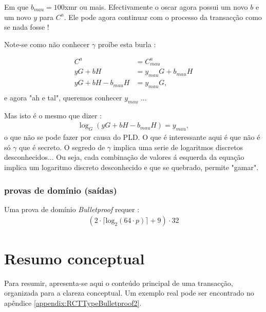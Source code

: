 Em que $b_{mau} = 100$xmr ou mais. Efectivamente o oscar agora possui um novo $b$ e um novo $y$ para $C^a$. Ele pode agora continuar com o processo da transacção como se nada fosse ! 

Note-se como não conhecer $\gamma$ proíbe esta burla :

\begin{align*}
C^a &= C^a_{mau}\\
y G + b H &= y_{mau} G + b_{mau} H \\
y G + b H - b_{mau} H &= y_{mau} G,\\
\end{align*}
e agora "ah e tal", queremos conhecer $y_{mau}$ ...

Mas isto é o mesmo que dizer : 
\begin{align*}
\log_{G} (y G + b H - b_{mau} H) = y_{mau},
\end{align*}
o que não se pode fazer por causa do PLD. O que é interessante aqui é que não é só $\gamma$ que é secreto. O segredo de $\gamma$ implica uma serie de logaritmos discretos desconhecidos... Ou seja, cada combinação de valores á esquerda da equação implica um logaritmo discreto desconhecido e que se quebrado, permite "gamar". 


\subsubsection*{provas de domínio (saídas)}

Uma prova de domínio {\em Bulletproof} requer :
\begin{align*}
(2 \cdot \lceil \textrm{log}_2(64 \cdot p) \rceil + 9) \cdot 32
\end{align*}


\newpage
\section{Resumo conceptual}
\label{sec:transaction_summary}

Para resumir, apresenta-se aqui o conteúdo principal de uma transacção, organizada para a clareza conceptual. Um exemplo real pode ser encontrado no apêndice \ref{appendix:RCTTypeBulletproof2}. 


